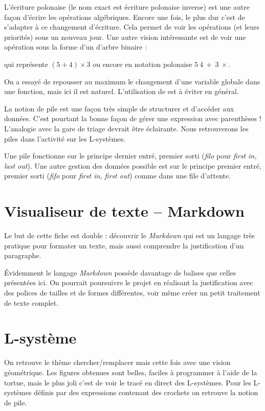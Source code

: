 \documentclass[11pt,class=report,crop=false]{standalone}
\begin{document}
L'écriture polonaise (le nom exact est \og{}écriture polonaise inverse\fg{}) est une autre façon d'écrire les opérations algébriques. Encore une fois, le plus dur c'est de s'adapter à ce changement d'écriture. Cela permet de voir les opérations (et leurs priorités) sous un nouveau jour. Une autre vision intéressante est de voir une opération sous la forme d'un d'arbre binaire :

qui représente $(5 + 4) \times 3$ ou encore en notation polonaise $5 \ 4 \ +\  3 \ \times$.

On a essayé de repousser au maximum le changement d'une variable globale dans une fonction, mais ici il est naturel. L'utilisation de  est à éviter en général.

La notion de pile est une façon très simple de structurer et d'accéder aux données.
C'est pourtant la bonne façon de gérer une expression avec parenthèses ! L'analogie avec la gare de triage devrait être éclairante. 
Nous retrouverons les piles dans l'activité sur les L-systèmes.


Une pile fonctionne sur le principe \og{}dernier entré, premier sorti\fg{} (\emph{filo} pour \emph{first in, last out}). Une autre gestion des données possible est sur le principe \og{}premier entré, premier sorti\og{} (\emph{fifo} pour \emph{first in, first out}) comme dans une file d'attente.

\section{Visualiseur de texte -- Markdown}

Le but de cette fiche est double : découvrir le \emph{Markdown} qui est un langage très pratique pour formater un texte, mais aussi comprendre la justification d'un paragraphe.

Évidemment le langage \emph{Markdown} possède davantage de balises que celles présentées ici. On pourrait poursuivre le projet en réalisant la justification avec des polices de tailles et de formes différentes, voir même créer un petit traitement de texte complet.


\section{L-système}

On retrouve le thème \og{}chercher/remplacer\fg{} mais cette fois avec une vision géométrique. Les figures obtenues sont belles, faciles à programmer à l'aide de la tortue, mais le plus joli c'est de voir le tracé en direct des L-systèmes.
Pour les L-systèmes définis par des expressions contenant des crochets on retrouve la notion de pile. 
\end{document}
